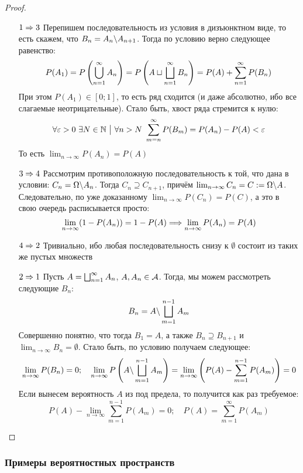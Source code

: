 \begin{proof}~
	\begin{itemize}
		\item[$1 \Rightarrow 3$] Перепишем последовательность из условия в дизъюнктном виде, то есть скажем, что $B_n = A_n \backslash A_{n + 1}$. Тогда по условию верно следующее равенство:
		\[
			P(A_1) = P\left(\bigcup_{n = 1}^\infty A_n\right) = P\left(A \sqcup \bigsqcup_{n = 1}^\infty B_n\right) = P(A) + \sum_{n = 1}^\infty P(B_n)
		\]
		При этом $P(A_1) \in [0; 1]$, то есть ряд сходится (и даже абсолютно, ибо все слагаемые неотрицательные). Стало быть, хвост ряда стремится к нулю:
		\[
			\forall \varepsilon > 0\ \exists N \in \mathbb{N} \ \big|\  \forall n > N\ \sum_{m = n}^\infty P(B_m) = P(A_n) - P(A) < \varepsilon
		\]
		То есть $\lim_{n \to \infty} P(A_n) = P(A)$
		
		\item[$3 \Rightarrow 4$] Рассмотрим противоположную последовательность к той, что дана в условии: $C_n = \Omega \backslash A_n$. Тогда $C_n \supseteq C_{n + 1}$, причём $\lim_{n \to \infty} C_n = C := \Omega \backslash A$. Следовательно, по уже доказанному $\lim_{n \to \infty} P(C_n) = P(C)$, а это в свою очередь расписывается просто:
		\[
			\lim_{n \to \infty} (1 - P(A_n)) = 1 - P(A) \Longrightarrow \lim_{n \to \infty} P(A_n) = P(A)
		\]
		
		\item[$4 \Rightarrow 2$] Тривиально, ибо любая последовательность снизу к $\emptyset$ состоит из таких же пустых множеств
		
		\item[$2 \Rightarrow 1$] Пусть $A = \bigsqcup_{n = 1}^\infty A_n$, $A, A_n \in \mathcal{A}$. Тогда, мы можем рассмотреть следующие $B_n$:
		\[
			B_n = A \backslash \bigsqcup_{m = 1}^{n - 1} A_m
		\]
		Совершенно понятно, что тогда $B_1 = A$, а также $B_n \supseteq B_{n + 1}$ и $\lim_{n \to \infty} B_n = \emptyset$. Стало быть, по условию получаем следующее:
		\[
			\lim_{n \to \infty} P(B_n) = 0; \quad \lim_{n \to \infty} P\left(A \backslash \bigsqcup_{m = 1}^{n - 1} A_m\right) = \lim_{n \to \infty} \left(P(A) - \sum_{m = 1}^{n - 1} P(A_m)\right) = 0
		\]
		Если вынесем вероятность $A$ из под предела, то получится как раз требуемое:
		\[
			P(A) - \lim_{n \to \infty} \sum_{m = 1}^{n - 1} P(A_m) = 0; \quad P(A) = \sum_{m = 1}^\infty P(A_m)
		\]
	\end{itemize}
\end{proof}

\subsubsection*{Примеры вероятностных пространств}

